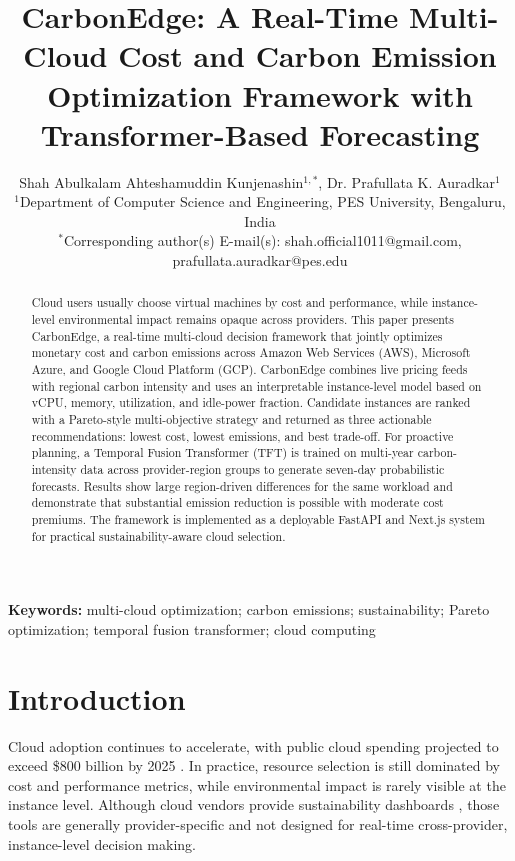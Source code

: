 \documentclass[12pt]{article}
\begin{document}
\title{CarbonEdge: A Real-Time Multi-Cloud Cost and Carbon Emission Optimization Framework with Transformer-Based Forecasting}

\author{
\normalsize Shah Abulkalam Ahteshamuddin Kunjenashin$^{1,*}$, Dr. Prafullata K. Auradkar$^{1}$\\[4pt]
\small $^{1}$Department of Computer Science and Engineering, PES University, Bengaluru, India\\
\small $^{*}$Corresponding author(s) E-mail(s): \small {shah.official1011@gmail.com}, {prafullata.auradkar@pes.edu}\\
}
\date{}

\maketitle

\begin{abstract}
Cloud users usually choose virtual machines by cost and performance, while instance-level environmental impact remains opaque across providers. This paper presents CarbonEdge, a real-time multi-cloud decision framework that jointly optimizes monetary cost and carbon emissions across Amazon Web Services (AWS), Microsoft Azure, and Google Cloud Platform (GCP). CarbonEdge combines live pricing feeds with regional carbon intensity and uses an interpretable instance-level model based on vCPU, memory, utilization, and idle-power fraction. Candidate instances are ranked with a Pareto-style multi-objective strategy and returned as three actionable recommendations: lowest cost, lowest emissions, and best trade-off. For proactive planning, a Temporal Fusion Transformer (TFT) is trained on multi-year carbon-intensity data across provider-region groups to generate seven-day probabilistic forecasts. Results show large region-driven differences for the same workload and demonstrate that substantial emission reduction is possible with moderate cost premiums. The framework is implemented as a deployable FastAPI and Next.js system for practical sustainability-aware cloud selection.
\end{abstract}

\noindent\textbf{Keywords:} multi-cloud optimization; carbon emissions; sustainability; Pareto optimization; temporal fusion transformer; cloud computing

\section{Introduction}
Cloud adoption continues to accelerate, with public cloud spending projected to exceed \$800 billion by 2025 \citep{b1}. In practice, resource selection is still dominated by cost and performance metrics, while environmental impact is rarely visible at the instance level. Although cloud vendors provide sustainability dashboards \citep{b2,b3,b4}, those tools are generally provider-specific and not designed for real-time cross-provider, instance-level decision making.
\end{document}
